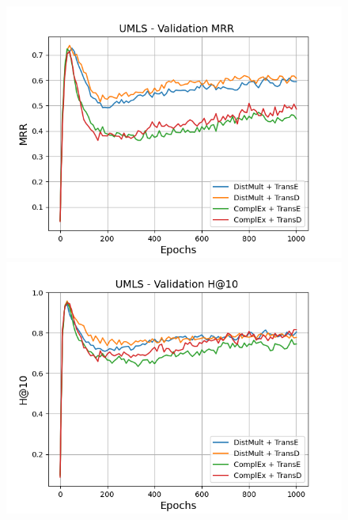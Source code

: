 \begin{figure}[H]
    \centering
    \begin{minipage}{.45\textwidth}
      \centering
      \includegraphics[width=0.9\linewidth]{figures/results/gan_train/not_pretrained/random/umls/epochs1000/random_umls_mrrs.png}
    \end{minipage}%
    \begin{minipage}{.45\textwidth}
      \centering
      \includegraphics[width=0.9\linewidth]{figures/results/gan_train/not_pretrained/random/umls/epochs1000/random_umls_hit10.png}
    \end{minipage}
    

\end{figure}

